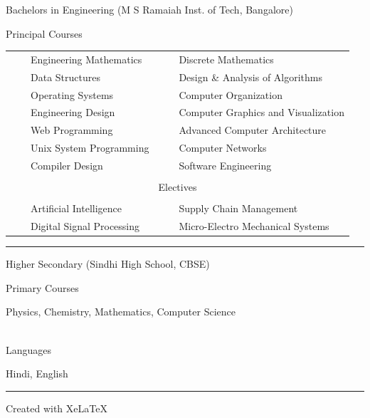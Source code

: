 \documentclass[a4paper,10pt]{article} %
\newcommand{\tabitem}{~~\llap{\textbullet}~~}
\begin{document}
\bigskip

\par{\centering\Large \hypertarget{msrit}{Bachelors in Engineering (M S Ramaiah Inst. of Tech, Bangalore) }\par}
\large{\centering Principal Courses\par}
\normalsize
\begin{center}
\begin{tabular}{ll}
\tabitem Engineering Mathematics & \tabitem Discrete Mathematics \\
\tabitem Data Structures & \tabitem Design \& Analysis of Algorithms \\
\tabitem Operating Systems & \tabitem Computer Organization \\
\tabitem Engineering Design & \tabitem Computer Graphics and Visualization \\
\tabitem Web Programming & \tabitem Advanced Computer Architecture \\
\tabitem Unix System Programming & \tabitem Computer Networks \\
\tabitem Compiler Design & \tabitem Software Engineering \\
&\\
\multicolumn{2}{c}{\large{\centering Electives\par}} \\ 
&\\
\tabitem Artificial Intelligence  & \tabitem Supply Chain Management  \\
\tabitem Digital Signal Processing & \tabitem Micro-Electro Mechanical Systems\\
\end{tabular}
\end{center}
\bigskip
\hrule
\bigskip

\bigskip


\par{\centering\Large \hypertarget{hs}{Higher Secondary (Sindhi High School, CBSE) }\par}
\begin{center}
\large{Primary Courses\par}
\normalsize
Physics, Chemistry, Mathematics, Computer Science \\
~\\
\large{Languages\par}
\normalsize
Hindi, English \\
\end{center}
\bigskip
\hrule
\bigskip
\vfill
\centerline{Created with Xe\LaTeX\ }
\fi
\end{document}
